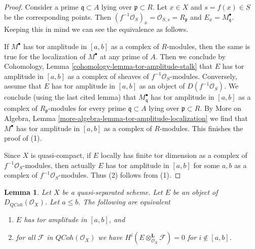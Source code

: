 \documentclass{stacks-project}
\theoremstyle{plain}
\newtheorem{lemma}[subsection]{Lemma}
\theoremstyle{definition}
\theoremstyle{remark}
\numberwithin{equation}{subsection}
\def\QCoh{\mathit{QCoh}}
\begin{document}
\begin{proof}
Consider a prime $\mathfrak q \subset A$ lying over $\mathfrak p \subset R$.
Let $x \in X$ and $s = f(x) \in S$ be the corresponding points.
Then $(f^{-1}\mathcal{O}_S)_x = \mathcal{O}_{S, s} = R_\mathfrak p$
and $E_x = M^\bullet_\mathfrak q$. Keeping this in mind we can see
the equivalence as follows.

\medskip\noindent
If $M^\bullet$ has tor amplitude in $[a, b]$ as a complex of $R$-modules,
then the same is true for the localization of $M^\bullet$ at any prime of $A$.
Then we conclude by
Cohomology, Lemma \ref{cohomology-lemma-tor-amplitude-stalk}
that $E$ has tor amplitude in $[a, b]$ as a complex of sheaves
of $f^{-1}\mathcal{O}_S$-modules.
Conversely, assume that $E$ has tor amplitude in $[a, b]$
as an object of $D(f^{-1}\mathcal{O}_S)$.
We conclude (using the last cited lemma) that
$M^\bullet_\mathfrak q$ has tor amplitude in $[a, b]$
as a complex of $R_\mathfrak p$-modules for every
prime $\mathfrak q \subset A$ lying over $\mathfrak p \subset R$.
By More on Algebra, Lemma \ref{more-algebra-lemma-tor-amplitude-localization}
we find that $M^\bullet$ has tor amplitude in $[a, b]$
as a complex of $R$-modules.
This finishes the proof of (1).

\medskip\noindent
Since $X$ is quasi-compact, if $E$ locally has finite tor dimension
as a complex of $f^{-1}\mathcal{O}_S$-modules, then actually $E$
has tor amplitude in $[a, b]$ for some $a, b$ as a complex of
$f^{-1}\mathcal{O}_S$-modules. Thus (2) follows from (1).
\end{proof}

\begin{lemma}
\label{lemma-tor-qc-qs}
Let $X$ be a quasi-separated scheme. Let $E$ be an object
of $D_\QCoh(\mathcal{O}_X)$. Let $a \leq b$. The
following are equivalent
\begin{enumerate}
\item $E$ has tor amplitude in $[a, b]$, and
\item for all $\mathcal{F}$ in $\QCoh(\mathcal{O}_X)$
we have $H^i(E \otimes_{\mathcal{O}_X}^\mathbf{L} \mathcal{F}) = 0$
for $i \not \in [a, b]$.
\end{enumerate}
\end{lemma}
\end{document}
